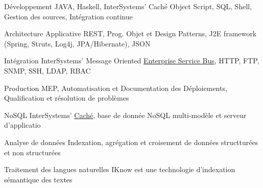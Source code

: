 

\begin{cvskills}

  \cvskill
    {Développement} %
    {JAVA, Haskell, InterSystems' Caché Object Script, SQL, Shell, Gestion des sources, Intégration continue} %

  \cvskill
    {Architecture Applicative} %
    {REST, Prog.  Objet et Design Patterns, J2E framework (Spring, Struts, Log4j, JPA/Hibernate), JSON} %

  \cvskill
    {Intégration} %
    {InterSystems' Message Oriented {\href{https://www.intersystems.com/products/ensemble}{Enterprise Service Bus}}, HTTP, FTP, SNMP, SSH, LDAP, RBAC} %

  \cvskill
    {Production} %
    {MEP, Automatisation et Documentation des Déploiements, Qualification et résolution de problèmes} %

  \cvskill
    {NoSQL} %
    {InterSystems' \href{https://www.intersystems.com/products/cache}{Caché}, base de donnée NoSQL multi-modèle et serveur d'applicatio} %

  \cvskill
    {Analyse de données} %
    {Indexation, agrégation et croisement de données structturées et non structurées} %

  \cvskill
    {Traitement des langues naturelles} %
    {IKnow est une technologie d'indexation sémantique des textes} %

\end{cvskills}
